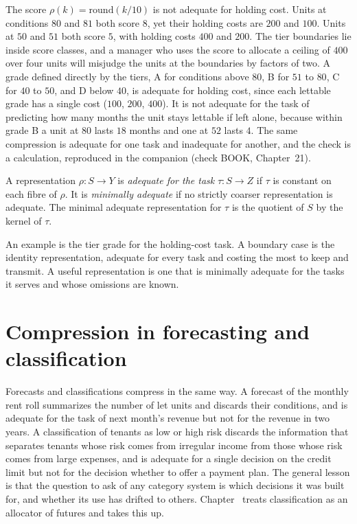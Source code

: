 The score $\rho(k)=\mathrm{round}(k/10)$ is not adequate for holding cost. Units at conditions $80$ and $81$ both score $8$, yet their holding costs are $200$ and $100$. Units at $50$ and $51$ both score $5$, with holding costs $400$ and $200$. The tier boundaries lie inside score classes, and a manager who uses the score to allocate a ceiling of $400$ over four units will misjudge the units at the boundaries by factors of two. A grade defined directly by the tiers, A for conditions above $80$, B for $51$ to $80$, C for $40$ to $50$, and D below $40$, is adequate for holding cost, since each lettable grade has a single cost ($100$, $200$, $400$). It is not adequate for the task of predicting how many months the unit stays lettable if left alone, because within grade B a unit at $80$ lasts $18$ months and one at $52$ lasts $4$. The same compression is adequate for one task and inadequate for another, and the check is a calculation, reproduced in the companion (check BOOK, Chapter~21).

\begin{definition}\label{def:adequacy}
A representation $\rho:S\to Y$ is \emph{adequate for the task} $\tau:S\to Z$ if $\tau$ is constant on each fibre of $\rho$. It is \emph{minimally adequate} if no strictly coarser representation is adequate. The minimal adequate representation for $\tau$ is the quotient of $S$ by the kernel of $\tau$.
\end{definition}

An example is the tier grade for the holding-cost task. A boundary case is the identity representation, adequate for every task and costing the most to keep and transmit. A useful representation is one that is minimally adequate for the tasks it serves and whose omissions are known.

\section{Compression in forecasting and classification}

Forecasts and classifications compress in the same way. A forecast of the monthly rent roll summarizes the number of let units and discards their conditions, and is adequate for the task of next month's revenue but not for the revenue in two years. A classification of tenants as low or high risk discards the information that separates tenants whose risk comes from irregular income from those whose risk comes from large expenses, and is adequate for a single decision on the credit limit but not for the decision whether to offer a payment plan. The general lesson is that the question to ask of any category system is which decisions it was built for, and whether its use has drifted to others. Chapter~ treats classification as an allocator of futures and takes this up.

